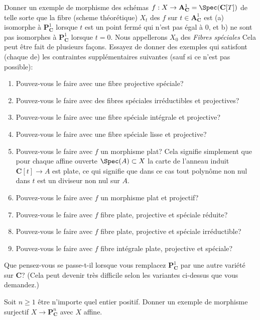 \begin{exercise}
\label{exercise-family-special-fibre-different}
Donner un exemple de morphisme des schémas
$f : X \to {\mathbf A}^1_{\mathbf C} = \Spec({\mathbf C}[T])$ de
telle sorte que la fibre (scheme théorétique) $X_t$ des $f$ sur
$t \in {\mathbf A}^1_{\mathbf C}$ est
(a) isomorphe à ${\mathbf P}^1_{\mathbf C}$ lorsque $t$ est un
point fermé qui n'est pas égal à
$0$, et b) ne sont pas isomorphes à ${\mathbf P}^1_{\mathbf C}$
lorsque $t = 0$. Nous appellerons $X_0$ des {\it Fibres spéciales}
Cela peut être fait de plusieurs façons. Essayez de donner des
exemples qui satisfont (chaque de) les contraintes supplémentaires suivantes (sauf si ce
n'est pas possible):
\begin{enumerate}
\item Pouvez-vous le faire avec une fibre projective spéciale?
\item Pouvez-vous le faire avec des fibres spéciales irréductibles et projectives?
\item Pouvez-vous le faire avec une fibre spéciale intégrale et projective?
\item Pouvez-vous le faire avec une fibre spéciale lisse et projective?
\item Pouvez-vous le faire avec $f$ un morphisme plat?
Cela signifie simplement que pour chaque affine ouverte $\Spec(A) \subset X$ la carte de
l'anneau induit $\mathbf{C}[t] \to A$ est plate, ce qui signifie que dans ce cas
tout polynôme non nul dans $t$ est un diviseur non nul sur $A$.
\item Pouvez-vous le faire avec $f$ un morphisme plat et projectif?
\item Pouvez-vous le faire avec $f$ fibre plate, projective et spéciale réduite?
\item Pouvez-vous le faire avec $f$ fibre plate, projective et spéciale irréductible?
\item Pouvez-vous le faire avec $f$ fibre intégrale plate, projective et spéciale?
\end{enumerate}
Que pensez-vous se passe-t-il lorsque vous remplacez
${\mathbf P}^1_{\mathbf C}$ par une autre variété sur ${\mathbf C}$?
(Cela peut devenir très difficile selon les variantes ci-dessus que vous
demandez.)
\end{exercise}

\begin{exercise}
\label{exercise-affine-onto-projective-space}
Soit $n \geq 1$ être n'importe quel
entier positif. Donner un exemple de morphisme
surjectif $X \to {\mathbf P}^n_{\mathbf C}$ avec $X$ affine.
\end{exercise}

